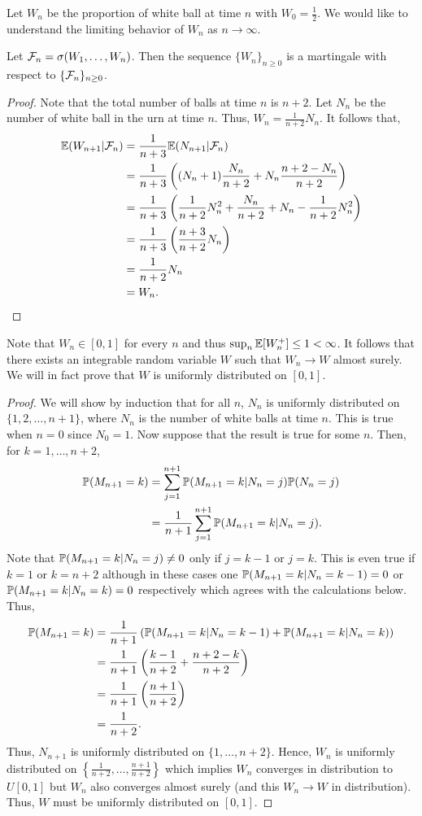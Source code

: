 Let $W_n$ be the proportion of white ball at time $n$ with $W_0=\frac{1}{2}$. We would like to understand the limiting behavior of $W_n$ as $n \to \infty$.
\begin{proposition}
    Let ${\mathcal{F}}_n = \sigma(W_1,\ldots, W_n)$. Then the sequence $\{W_n\}_{n \ge 0}$ is a martingale with respect to $\{{\mathcal{F}}_n\}_{n\ge 0}$.
\end{proposition}
\begin{proof}
    Note that the total number of balls at time $n$ is $n+2$. Let $N_n$ be the number of white ball in the urn at time $n$. Thus, $W_n = \frac{1}{n+2}N_n$. It follows that,
    \begin{align*}
        {\mathbb{E}}(W_{n+1}|{\mathcal{F}}_n) &= \frac{1}{n+3}{\mathbb{E}}(N_{n+1}|{\mathcal{F}}_n)\\
        &=\frac{1}{n+3}\left((N_{n}+1)\frac{N_n}{n+2}+N_n\frac{n+2-N_n}{n+2}\right)\\
        &=\frac{1}{n+3}\left(\frac{1}{n+2}N_n^2 + \frac{N_n}{n+2}+N_n-\frac{1}{n+2}N_n^2\right)\\
        &=\frac{1}{n+3}\left(\frac{n+3}{n+2}N_n\right)\\
        &=\frac{1}{n+2}N_n\\
        &=W_n.\qedhere 
    \end{align*}
\end{proof}
Note that $W_n \in [0,1]$ for every $n$ and thus $\sup_n {\mathbb{E}}[W_n^+]\le 1< \infty$. It follows that there exists an integrable random variable $W$ such that $W_n \to W$ almost surely. We will in fact prove that $W$ is uniformly distributed on $[0,1]$.
\begin{proof}
    We will show by induction that for all $n$, $N_n$ is uniformly distributed on $\{1,2,\ldots,n+1\}$, where $N_n$ is the number of white balls at time $n$. This is true when $n=0$ since $N_0 = 1$. Now suppose that the result is true for some $n$. Then, for $k=1,\ldots,n+2$,
    \begin{align*}
        {\mathbb{P}}(M_{n+1} = k) &=\sum_{j=1}^{n+1} {\mathbb{P}}(M_{n+1}=k|N_n = j){\mathbb{P}}(N_n=j)\\
        &=\frac{1}{n+1}\sum_{j=1}^{n+1} {\mathbb{P}}(M_{n+1}=k|N_n = j).
    \end{align*}
    Note that ${\mathbb{P}}(M_{n+1}=k|N_n=j) \neq 0$  only if $j = k-1$ or $j=k$. This is even true if $k=1$ or $k=n+2$ although in these cases one  ${\mathbb{P}}(M_{n+1}=k|N_n=k-1) =0$ or ${\mathbb{P}}(M_{n+1}=k|N_n=k)=0$ respectively which agrees with the calculations below. Thus,
    \begin{align*}
        {\mathbb{P}}(M_{n+1} = k) &=\frac{1}{n+1}\left({\mathbb{P}}(M_{n+1}=k|N_n=k-1)+{\mathbb{P}}(M_{n+1}=k|N_n=k)\right)\\
        &=\frac{1}{n+1}\left(\frac{k-1}{n+2}+\frac{n+2-k}{n+2}\right)\\
        &=\frac{1}{n+1}\left(\frac{n+1}{n+2}\right)\\
        &=\frac{1}{n+2}.
    \end{align*}
    Thus, $N_{n+1}$ is uniformly distributed on $\{1,\ldots,n+2\}$. Hence, $W_n$ is uniformly distributed on $\left\{\frac{1}{n+2},\ldots,\frac{n+1}{n+2}\right\}$ which implies $W_n$ converges in distribution to $U[0,1]$ but $W_n$ also converges almost surely (and this $W_n \to W$ in distribution). Thus, $W$ must be uniformly distributed on $[0,1]$.
\end{proof}
